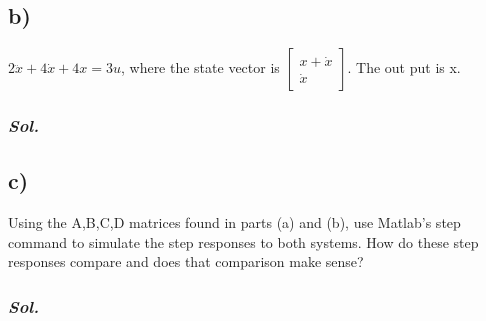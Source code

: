     \subsection{b)} 
    $2\ddot{x} + 4\dot{x} + 4x=3u$, where the state vector is 
    $\begin{bmatrix}
        x + \dot{x} \\
        \dot{x}
    \end{bmatrix}$.
    The out put is x.
    \subsubsection{\textit{ Sol. }}
    

    \subsection{c)}
    Using the A,B,C,D matrices found in parts (a) and (b), use Matlab's step command to simulate the step responses to both systems. How do these step responses compare and does that comparison make sense? 
    \subsubsection{\textit{ Sol. }}


\pagebreak